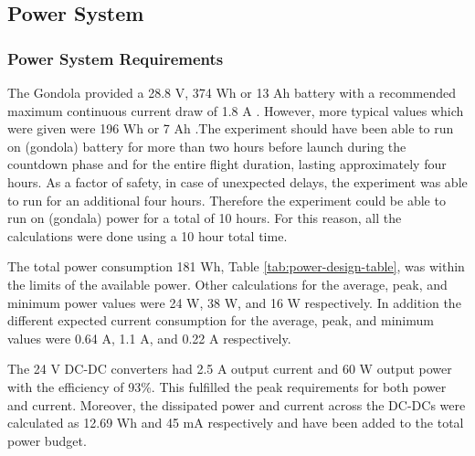 \pagebreak
\subsection{Power System}

\subsubsection{Power System Requirements}
\begin{centering}
The Gondola provided a 28.8 V, 374 Wh or 13 Ah battery with a recommended maximum continuous current draw of 1.8 A . However, more typical values which were given were 196 Wh or 7 Ah \cite{BexusManual}.The experiment should have been able to run on (gondola) battery for more than two hours before launch during the countdown phase and for the entire flight duration, lasting approximately four hours. As a factor of safety, in case of unexpected delays, the experiment was able to run for an additional four hours. Therefore the experiment could be able to run on (gondala) power for a total of 10 hours. For this reason, all the calculations were done using a 10 hour total time\cite{BexusManual}.
\end{centering}





The total power consumption 181 Wh, Table \ref{tab:power-design-table}, was within the limits of the available power. Other calculations for the average, peak, and minimum power values were 24 W, 38 W, and 16 W respectively. In addition the different expected current consumption for the average, peak, and minimum values were 0.64 A, 1.1 A, and 0.22 A respectively.

The 24 V DC-DC converters had 2.5 A output current and 60 W output power with the efficiency of 93\%. This fulfilled the peak requirements for both power and current. Moreover, the dissipated power and current across the DC-DCs were calculated as 12.69 Wh and 45 mA respectively and have been added to the total power budget. 



\raggedbottom
